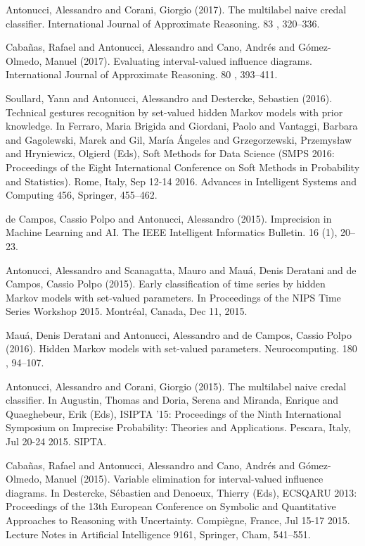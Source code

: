 \begin{cventries}
\begin{cvitems}
\item Antonucci, Alessandro and Corani, Giorgio (2017).   The multilabel naive credal classifier.   International Journal of Approximate Reasoning. 83 , 320–336.
\item Cabañas, Rafael and Antonucci, Alessandro and Cano, Andrés and Gómez-Olmedo, Manuel (2017).   Evaluating interval-valued influence diagrams.   International Journal of Approximate Reasoning. 80 , 393–411.
\item Soullard, Yann and Antonucci, Alessandro and Destercke, Sebastien (2016).   Technical gestures recognition by set-valued hidden Markov models with prior knowledge.   In Ferraro, Maria Brigida and Giordani, Paolo and Vantaggi, Barbara and Gagolewski, Marek and Gil, María Ángeles and Grzegorzewski, Przemysław and Hryniewicz, Olgierd (Eds), Soft Methods for Data Science (SMPS 2016: Proceedings of the Eight International Conference on Soft Methods in Probability and Statistics).   Rome, Italy, Sep 12-14 2016.   Advances in Intelligent Systems and Computing 456, Springer, 455–462.
\item de Campos, Cassio Polpo and Antonucci, Alessandro (2015).   Imprecision in Machine Learning and AI.   The IEEE Intelligent Informatics Bulletin. 16 (1), 20–23.
\item Antonucci, Alessandro and Scanagatta, Mauro and Mauá, Denis Deratani and de Campos, Cassio Polpo (2015).   Early classification of time series by hidden Markov models with set-valued parameters.   In Proceedings of the NIPS Time Series Workshop 2015.   Montréal, Canada,   Dec 11, 2015.
\item Mauá, Denis Deratani and Antonucci, Alessandro and de Campos, Cassio Polpo (2016).   Hidden Markov models with set-valued parameters.   Neurocomputing. 180 , 94–107.
\item Antonucci, Alessandro and Corani, Giorgio (2015).   The multilabel naive credal classifier.   In Augustin, Thomas and Doria, Serena and Miranda, Enrique and Quaeghebeur, Erik (Eds), ISIPTA ’15: Proceedings of the Ninth International Symposium on Imprecise Probability: Theories and Applications.   Pescara, Italy,   Jul 20-24 2015.   SIPTA.
\item Cabañas, Rafael and Antonucci, Alessandro and Cano, Andrés and Gómez-Olmedo, Manuel (2015).   Variable elimination for interval-valued influence diagrams.   In Destercke, Sébastien and Denoeux, Thierry (Eds), ECSQARU 2013: Proceedings of the 13th European Conference on Symbolic and Quantitative Approaches to Reasoning with Uncertainty.   Compiègne, France, Jul 15-17 2015.   Lecture Notes in Artificial Intelligence 9161, Springer, Cham, 541–551.

\end{cvitems}
\end{cventries}
